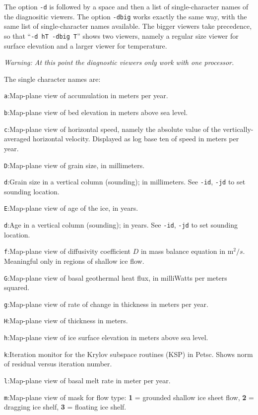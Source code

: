 \documentclass[11pt,final]{amsart}
\renewcommand{\t}[1]{\texttt{#1}}
\begin{document}
The option \t{-d} is followed by a space and then a list of single-character names of the diagnositic viewers.  The option \t{-dbig} works exactly the same way, with the same list of single-character names available.  The bigger viewers take precedence, so that ``\t{-d hT -dbig T}'' shows two viewers, namely a regular size viewer for surface elevation and a larger viewer for temperature.

\emph{Warning: At this point the diagnostic viewers only work with one processor.}

The single character names are:

\verb|a|:\quad Map-plane view of accumulation in meters per year.

\verb|b|:\quad Map-plane view of bed elevation in meters above sea level.

\verb|c|:\quad Map-plane view of horizontal speed, namely the absolute value of the vertically-averaged horizontal velocity.  Displayed as log base ten of speed in meters per year.

\verb|D|:\quad Map-plane view of grain size, in millimeters.

\verb|d|:\quad Grain size in a vertical column (sounding); in millimeters.  See \verb|-id|, \verb|-jd| to set sounding location.

\verb|E|:\quad Map-plane view of age of the ice, in years.

\verb|d|:\quad Age in a vertical column (sounding); in years.  See \verb|-id|, \verb|-jd| to set sounding location.

\verb|f|:\quad Map-plane view of diffusivity coefficient $D$ in mass balance equation in $\text{m}^2/s$.  Meaningful only in regions of shallow ice flow.

\verb|G|:\quad Map-plane view of basal geothermal heat flux, in milliWatts per meters squared.

\verb|g|:\quad Map-plane view of rate of change in thickness in meters per year.

\verb|H|:\quad Map-plane view of thickness in meters.

\verb|h|:\quad Map-plane view of ice surface elevation in meters above sea level.

\verb|k|:\quad Iteration monitor for the Krylov subspace routines (KSP) in Petsc.  Shows norm of residual versus iteration number.

\verb|l|:\quad Map-plane view of basal melt rate in meter per year.

\verb|m|:\quad Map-plane view of mask for flow type:  \textbf{1} = grounded shallow ice sheet flow,  \textbf{2} = dragging ice shelf, \textbf{3} = floating ice shelf.
\end{document}
